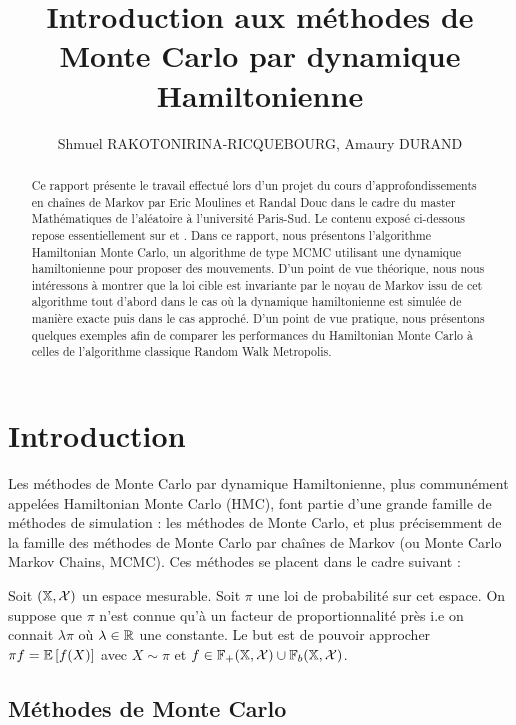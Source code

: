 \documentclass[10pt,a4paper]{article}
\title{Introduction aux méthodes de Monte Carlo par dynamique Hamiltonienne}
\author{Shmuel RAKOTONIRINA-RICQUEBOURG, Amaury DURAND}
\begin{document}
\maketitle

\begin{abstract}
Ce rapport présente le travail effectué lors d'un projet du cours d'approfondissements en chaînes de Markov par Eric Moulines et Randal Douc dans le cadre du master Mathématiques de l'aléatoire à l'université Paris-Sud. Le contenu exposé ci-dessous repose essentiellement sur \cite{Neal-hmc} et \cite{Douc-mc}. Dans ce rapport, nous présentons l'algorithme Hamiltonian Monte Carlo, un algorithme de type MCMC utilisant une dynamique hamiltonienne pour proposer des mouvements. D'un point de vue théorique, nous nous intéressons à montrer que la loi cible est invariante par le noyau de Markov issu de cet algorithme tout d'abord dans le cas où la dynamique hamiltonienne est simulée de manière exacte puis dans le cas approché. D'un point de vue pratique, nous présentons quelques exemples afin de comparer les performances du Hamiltonian Monte Carlo à celles de l'algorithme classique Random Walk Metropolis. 
\end{abstract}

\tableofcontents
\section{Introduction}
Les méthodes de Monte Carlo par dynamique Hamiltonienne, plus communément appelées Hamiltonian Monte Carlo (HMC), font partie d'une grande famille de méthodes de simulation : les méthodes de Monte Carlo, et plus précisemment de la famille des méthodes de Monte Carlo par chaînes de Markov (ou Monte Carlo Markov Chains, MCMC). Ces méthodes se placent dans le cadre suivant :
\begin{Def}
	Soit $(\mathbb{X}, \mathcal{X})$ un espace mesurable. Soit $\pi$ une loi de probabilité sur cet espace. On suppose que $\pi$ n'est connue qu'à un facteur de proportionnalité près i.e on connait $\lambda \pi$ où $\lambda \in \mathbb{R}$ une constante. Le but est de pouvoir approcher $\pi f = \EE[f(X)]$ avec $X \sim \pi$ et $f \in \mathbb{F}_+(\mathbb{X}, \mathcal{X}) \cup \mathbb{F}_b(\mathbb{X}, \mathcal{X})$.
\end{Def}

\subsection{Méthodes de Monte Carlo}
\end{document}
